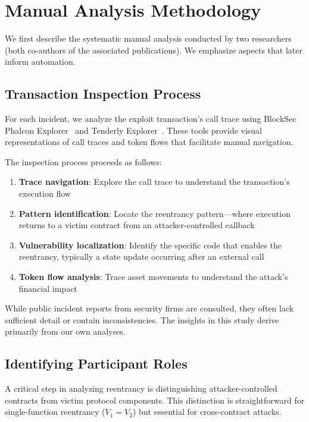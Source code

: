 \section{Manual Analysis Methodology}
\label{sec:meth-manual}

We first describe the systematic manual analysis conducted by two researchers (both co-authors of the associated publications). We emphasize aspects that later inform automation.

\subsection{Transaction Inspection Process}

For each incident, we analyze the exploit transaction's call trace using BlockSec Phalcon Explorer~\cite{blocksec-security-incidents} and Tenderly Explorer~\cite{tenderly}. These tools provide visual representations of call traces and token flows that facilitate manual navigation.

The inspection process proceeds as follows:
\begin{enumerate}
    \item \textbf{Trace navigation}: Explore the call trace to understand the transaction's execution flow
    \item \textbf{Pattern identification}: Locate the reentrancy pattern---where execution returns to a victim contract from an attacker-controlled callback
    \item \textbf{Vulnerability localization}: Identify the specific code that enables the reentrancy, typically a state update occurring after an external call
    \item \textbf{Token flow analysis}: Trace asset movements to understand the attack's financial impact
\end{enumerate}

While public incident reports from security firms are consulted, they often lack sufficient detail or contain inconsistencies. The insights in this study derive primarily from our own analyses.

\subsection{Identifying Participant Roles}
\label{sec:meth-roles}

A critical step in analyzing reentrancy is distinguishing attacker-controlled contracts from victim protocol components. This distinction is straightforward for single-function reentrancy ($V_1 = V_2$) but essential for cross-contract attacks.


